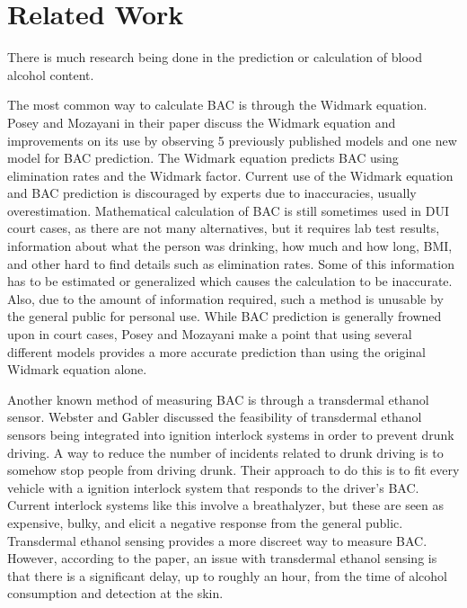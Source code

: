 \section{Related Work}
%
%

There is much research being done in the prediction or calculation of blood alcohol content. 

The most common way to calculate BAC is through the Widmark equation. Posey and Mozayani in their paper \cite{Posey:2007} discuss the Widmark equation and improvements on its use by observing 5 previously published models and one new model for BAC prediction. The Widmark equation predicts BAC using elimination rates and the Widmark factor. Current use of the Widmark equation and BAC prediction is discouraged by experts due to inaccuracies, usually overestimation. Mathematical calculation of BAC is still sometimes used in DUI court cases, as there are not many alternatives, but it requires lab test results, information about what the person was drinking, how much and how long, BMI, and other hard to find details such as elimination rates. Some of this information has to be estimated or generalized which causes the calculation to be inaccurate. Also, due to the amount of information required, such a method is unusable by the general public for personal use. While BAC prediction is generally frowned upon in court cases, Posey and Mozayani make a point that using several different models provides a more accurate prediction than using the original Widmark equation alone.

Another known method of measuring BAC is through a transdermal ethanol sensor. Webster and Gabler \cite{Webster:2007} discussed the feasibility of transdermal ethanol sensors being integrated into ignition interlock systems in order to prevent drunk driving. A way to reduce the number of incidents related to drunk driving is to somehow stop people from driving drunk. Their approach to do this is to fit every vehicle with a ignition interlock system that responds to the driver's BAC. Current interlock systems like this involve a breathalyzer, but these are seen as expensive, bulky, and elicit a negative response from the general public. Transdermal ethanol sensing provides a more discreet way to measure BAC. However, according to the paper, an issue with transdermal ethanol sensing is that there is a significant delay, up to roughly an hour, from the time of alcohol consumption and detection at the skin. 

